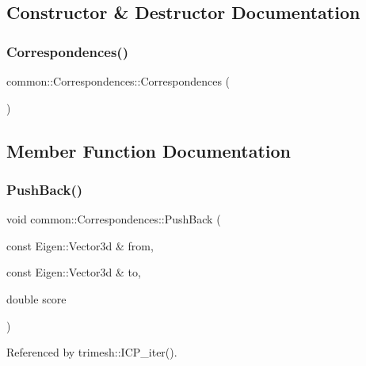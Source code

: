 \subsection{Constructor \& Destructor Documentation}
\mbox{\label{structcommon_1_1Correspondences_ae1eb166beacea5976106c5479aeb86ad}} 
\subsubsection{\texorpdfstring{Correspondences()}{Correspondences()}}
{\footnotesize\ttfamily common\+::\+Correspondences\+::\+Correspondences (\begin{DoxyParamCaption}{ }\end{DoxyParamCaption})\hspace{0.3cm}{\ttfamily [inline]}}



\subsection{Member Function Documentation}
\mbox{\label{structcommon_1_1Correspondences_a50974cb762f1621d1bd5cd9b4ee1eb80}} 
\subsubsection{\texorpdfstring{Push\+Back()}{PushBack()}}
{\footnotesize\ttfamily void common\+::\+Correspondences\+::\+Push\+Back (\begin{DoxyParamCaption}\item[{const Eigen\+::\+Vector3d \&}]{from,  }\item[{const Eigen\+::\+Vector3d \&}]{to,  }\item[{double}]{score }\end{DoxyParamCaption})\hspace{0.3cm}{\ttfamily [inline]}}



Referenced by trimesh\+::\+I\+C\+P\+\_\+iter().



